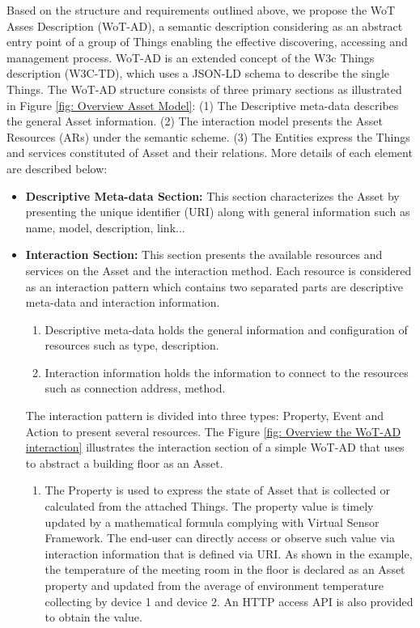 Based on the structure and requirements outlined above, we propose the WoT Asses Description (WoT-AD), a semantic description considering as an abstract entry point of a group of Things enabling the effective discovering, accessing and management process. WoT-AD is an extended concept of the W3c Things description (W3C-TD), which uses a JSON-LD schema to describe the single Things. The WoT-AD structure consists of three primary sections as illustrated in Figure \ref{fig: Overview Asset Model}: 
(1) The Descriptive meta-data describes the general Asset information. 
(2) The interaction model presents the Asset Resources (ARs) under the semantic scheme.
(3) The Entities express the Things and services constituted of Asset and their relations. More details of each element are described below:
\begin{itemize}
	\item \textbf{Descriptive Meta-data Section:} This section characterizes the Asset by presenting the unique identifier (URI) along with general information such as name, model, description, link... 
	\item \textbf{Interaction Section:} This section presents the available resources and services on the Asset and the interaction method. Each resource is considered as an interaction pattern which contains two separated parts are descriptive meta-data and interaction information.  
	\begin{enumerate}
		\item Descriptive meta-data holds the general information and configuration of resources such as type, description.
		\item Interaction information holds the information to connect to the resources such as connection address, method.
	\end{enumerate}
	The interaction pattern is divided into three types: Property, Event and Action to present several resources. The Figure \ref{fig: Overview the WoT-AD interaction} illustrates the interaction section of a simple WoT-AD that uses to abstract a building floor as an Asset. 
	\begin{enumerate}
		\item The Property is used to express the state of Asset that is collected or calculated from the attached Things. The property value is timely updated by a mathematical formula complying with Virtual Sensor Framework. The end-user can directly access or observe such value via interaction information that is defined via URI. As shown in the example, the temperature of the meeting room in the floor is declared as an Asset property and updated from the average of environment temperature collecting by device 1 and device 2. An HTTP access API is also provided to obtain the value.

\end{enumerate}
\end{itemize}
